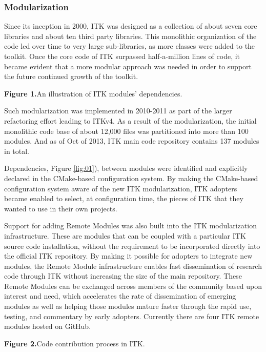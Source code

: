 \documentclass{frontiersENG} %
\begin{document}
\subsubsection{Modularization}

Since its inception in 2000, ITK was designed as a collection of about seven
core libraries and about ten third party libraries.  This monolithic
organization of the code led over time to very large sub-libraries, as more
classes were added to the toolkit. Once the core code of ITK surpassed
half-a-million lines of code, it became evident that a more modular approach
was needed in order to support the future continued growth of the toolkit.

\textbf{Figure 1.}{An illustration of ITK modules' dependencies.}\label{fig:01}

Such modularization was implemented in 2010-2011 as part of the larger
refactoring effort leading to ITKv4.  As a result of the modularization, the
initial monolithic code base of about 12,000 files was partitioned into more
than 100 modules.  And as of Oct of 2013, ITK main code repository contains
137 modules in total.

Dependencies, Figure \ref{fig:01}), between modules were identified and
explicitly declared in the CMake-based \cite{CMake} configuration system. By making the
CMake-based configuration system aware of the new ITK modularization, ITK
adopters became enabled to select, at configuration time, the pieces of ITK
that they wanted to use in their own projects.

Support for adding Remote Modules was also built into the ITK modularization
infrastructure. These are modules that can be coupled with a particular
ITK source code installation, without the requirement to be incorporated directly into
the official ITK repository. By making it possible for adopters to integrate
new modules, the Remote Module infrastructure enables fast
dissemination of research code through ITK without increasing the size of the
main repository. These Remote Modules can be exchanged across members of the
community based upon interest and need, which accelerates the rate
of dissemination of emerging modules as well as helping those modules mature
faster through the rapid use, testing, and commentary by early adopters. Currently
there are four ITK remote modules hosted on GitHub.

\textbf{Figure 2.}{Code contribution process in ITK.}\label{fig:02}
\end{document}
